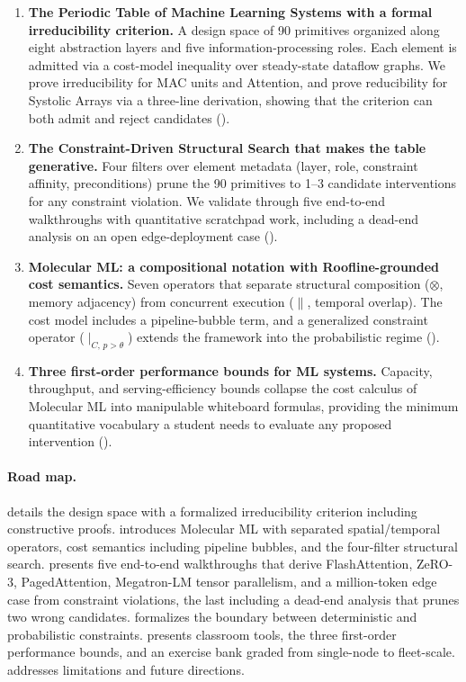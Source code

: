 \documentclass[10pt,twocolumn]{article}
\begin{document}
\begin{enumerate}[nosep, leftmargin=*, label=\textbf{C\arabic*.}]
\item \textbf{The Periodic Table of Machine Learning Systems with a formal irreducibility criterion.} A design space of 90 primitives organized along eight abstraction layers and five information-processing roles. Each element is admitted via a cost-model inequality over steady-state dataflow graphs. We prove irreducibility for MAC units and Attention, and prove reducibility for Systolic Arrays via a three-line derivation, showing that the criterion can both admit and reject candidates ().

\item \textbf{The Constraint-Driven Structural Search that makes the table generative.} Four filters over element metadata (layer, role, constraint affinity, preconditions) prune the 90 primitives to 1--3 candidate interventions for any constraint violation. We validate through five end-to-end walkthroughs with quantitative scratchpad work, including a dead-end analysis on an open edge-deployment case ().

\item \textbf{Molecular ML: a compositional notation with Roofline-grounded cost semantics.} Seven operators that separate structural composition ($\otimes$, memory adjacency) from concurrent execution ($\parallel$, temporal overlap). The cost model includes a pipeline-bubble term, and a generalized constraint operator ($\mid_{C,\, p > \theta}$) extends the framework into the probabilistic regime ().

\item \textbf{Three first-order performance bounds for ML systems.} Capacity, throughput, and serving-efficiency bounds collapse the cost calculus of Molecular ML into manipulable whiteboard formulas, providing the minimum quantitative vocabulary a student needs to evaluate any proposed intervention ().
\end{enumerate}

\paragraph{Road map.}  details the design space with a formalized irreducibility criterion including constructive proofs.  introduces Molecular ML with separated spatial/temporal operators, cost semantics including pipeline bubbles, and the four-filter structural search.  presents five end-to-end walkthroughs that derive FlashAttention, ZeRO-3, PagedAttention, Megatron-LM tensor parallelism, and a million-token edge case from constraint violations, the last including a dead-end analysis that prunes two wrong candidates.  formalizes the boundary between deterministic and probabilistic constraints.  presents classroom tools, the three first-order performance bounds, and an exercise bank graded from single-node to fleet-scale.  addresses limitations and future directions.
\end{document}
